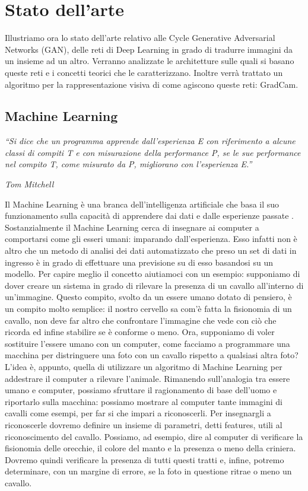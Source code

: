 \chapter{Stato dell'arte}
Illustriamo ora lo stato dell'arte relativo alle Cycle Generative Adversarial Networks (GAN), delle reti di Deep Learning in grado di tradurre immagini da un insieme ad un altro. Verranno analizzate le architetture sulle quali si basano queste reti e i concetti teorici che le caratterizzano. Inoltre verrà trattato un algoritmo per la rappresentazione visiva di come agiscono queste reti: GradCam.

\section{Machine Learning}
\emph{
    \textquotedblleft Si dice che un programma apprende dall'esperienza E con riferimento a alcune classi di compiti T e con misurazione della performance P, se le sue performance nel compito T, come misurato da P, migliorano con l'esperienza E.\textquotedblright
}
    \begin{flushright}
        \emph{Tom Mitchell \cite{tom1997hill}}
    \end{flushright}
Il Machine Learning è una branca dell'intelligenza artificiale che basa il suo funzionamento sulla capacità di apprendere dai dati e dalle esperienze passate \cite{mohri2018foundations}.
Sostanzialmente il Machine Learning cerca di insegnare ai computer a comportarsi come gli esseri umani: imparando dall'esperienza. Esso infatti non è altro che un metodo di analisi dei dati automatizzato che preso un set di dati in ingresso è in grado di effettuare una previsione su di esso basandosi su un modello.
Per capire meglio il concetto aiutiamoci con un esempio: supponiamo di dover creare un sistema in grado di rilevare la presenza di un cavallo all'interno di un'immagine. Questo compito, svolto da un essere umano dotato di pensiero, è un compito molto semplice: il nostro cervello sa com'è fatta la fisionomia di un cavallo, non deve far altro che confrontare l'immagine che vede con ciò che ricorda ed infine stabilire se è conforme o meno. Ora, supponiamo di voler sostituire l'essere umano con un computer, come facciamo a programmare una macchina per distringuere una foto con un cavallo rispetto a qualsiasi altra foto? L'idea è, appunto, quella di utilizzare un algoritmo di Machine Learning per addestrare il computer a rilevare l'animale. Rimanendo sull'analogia tra essere umano e computer, possiamo sfruttare il ragionamento di base dell'uomo e riportarlo sulla macchina: possiamo mostrare al computer tante immagini di cavalli come esempi, per far si che impari a riconoscerli. Per insegnargli a riconoscerle dovremo definire un insieme di parametri, detti features, utili al riconoscimento del cavallo. Possiamo, ad esempio, dire al computer di verificare la fisionomia delle orecchie, il colore del manto e la presenza o meno della criniera. Dovremo quindi verificare la presenza di tutti questi tratti e, infine, potremo determinare, con un margine di errore, se la foto in questione ritrae o meno un cavallo.

